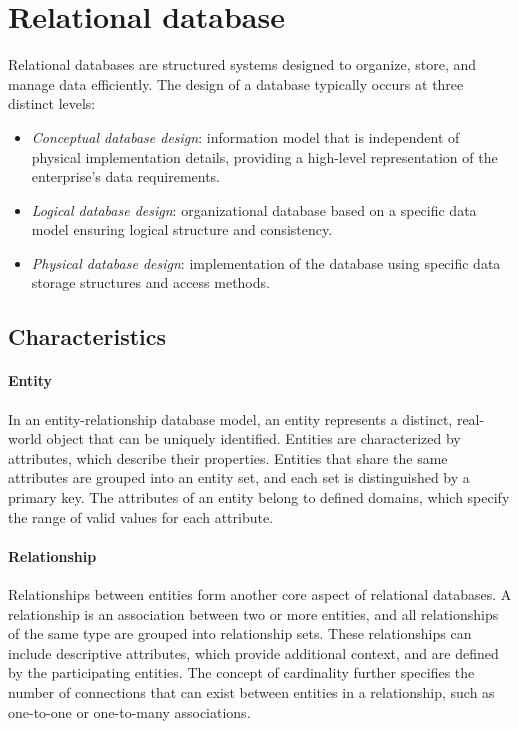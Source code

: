\section{Relational database}

Relational databases are structured systems designed to organize, store, and manage data efficiently.
The design of a database typically occurs at three distinct levels:
\begin{itemize}
    \item \textit{Conceptual database design}: information model that is independent of physical implementation details, providing a high-level representation of the enterprise's data requirements.
    \item \textit{Logical database design}: organizational database based on a specific data model ensuring logical structure and consistency.
    \item \textit{Physical database design}: implementation of the database using specific data storage structures and access methods.
\end{itemize}

\subsection{Characteristics}
\paragraph*{Entity}
In an entity-relationship database model, an entity represents a distinct, real-world object that can be uniquely identified. 
Entities are characterized by attributes, which describe their properties.
Entities that share the same attributes are grouped into an entity set, and each set is distinguished by a primary key. 
The attributes of an entity belong to defined domains, which specify the range of valid values for each attribute.

\paragraph*{Relationship}
Relationships between entities form another core aspect of relational databases. 
A relationship is an association between two or more entities, and all relationships of the same type are grouped into relationship sets. 
These relationships can include descriptive attributes, which provide additional context, and are defined by the participating entities. 
The concept of cardinality further specifies the number of connections that can exist between entities in a relationship, such as one-to-one or one-to-many associations.

